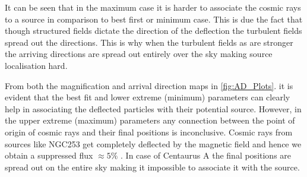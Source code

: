 \documentclass[usenatbib]{mnras}
\begin{document}
\begin{enumerate}
    It can be seen that in the maximum case it is harder to associate the cosmic rays to a source in comparison to best first or minimum case. This is due the fact that though structured fields dictate the direction of the deflection the turbulent fields spread out the directions. This is why when the turbulent fields as are stronger the arriving directions are spread out entirely over the sky making source localisation hard.
    \end{enumerate}
    
From both the magnification and arrival direction maps in \ref{fig:AD_Plots}. it is evident that the best fit and lower extreme (minimum) parameters can clearly help in associating the deflected particles with their potential source. However, in the upper extreme (maximum) parameters any connection between the point of origin of cosmic rays and their final positions is inconclusive. Cosmic rays from  sources like NGC253 get completely deflected by the magnetic field and hence we obtain a suppressed flux $\approx 5\%$ . In case of Centaurus A the final positions are spread out on the entire sky making it impossible to associate it with the source.






\end{document}
